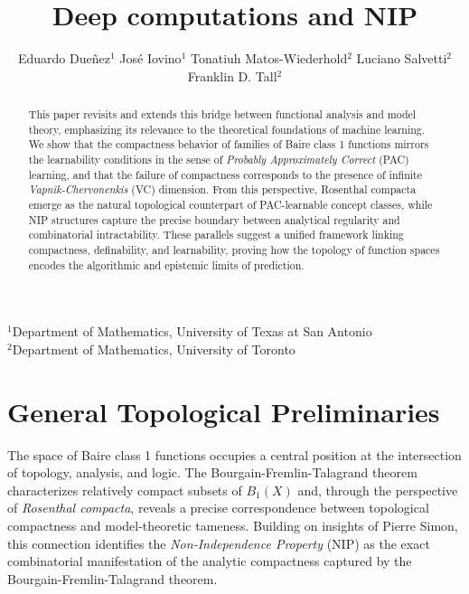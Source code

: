 \documentclass[psamsfonts]{amsart}
\title{Deep computations and NIP}
\author{
Eduardo Dueñez$^{1}$ \qquad
José Iovino$^{1}$ \qquad
Tonatiuh Matos-Wiederhold$^{2}$ \qquad
Luciano Salvetti$^{2}$ \qquad
Franklin D. Tall$^{2}$
}
\theoremstyle{definition}
\theoremstyle{remark}
\numberwithin{equation}{section}
\begin{document}
\maketitle

{\centering\tiny\vspace{-0.6cm}
$^{1}$Department of Mathematics, University of Texas at San Antonio\\
$^{2}$Department of Mathematics, University of Toronto\\
}

\begin{abstract}
This paper revisits and extends this bridge between functional analysis and model theory, emphasizing its relevance to the theoretical foundations of machine learning. We show that the compactness behavior of families of Baire class 1 functions mirrors the learnability conditions in the sense of \emph{Probably Approximately Correct} (PAC) learning, and that the failure of compactness corresponds to the presence of infinite \emph{Vapnik-Chervonenkis} (VC) dimension. From this perspective, Rosenthal compacta emerge as the natural topological counterpart of PAC-learnable concept classes, while NIP structures capture the precise boundary between analytical regularity and combinatorial intractability. These parallels suggest a unified framework linking compactness, definability, and learnability, proving how the topology of function spaces encodes the algorithmic and epistemic limits of prediction.
\end{abstract}

\maketitle

\section{General Topological Preliminaries}

The space of Baire class 1 functions occupies a central position at the intersection of topology, analysis, and logic. The Bourgain-Fremlin-Talagrand theorem characterizes relatively compact subsets of $B_1(X)$ and, through the perspective of \emph{Rosenthal compacta}, reveals a precise correspondence between topological compactness and model-theoretic tameness. Building on insights of Pierre Simon, this connection identifies the \emph{Non-Independence Property} (NIP) as the exact combinatorial manifestation of the analytic compactness captured by the Bourgain-Fremlin-Talagrand theorem.
\end{document}
